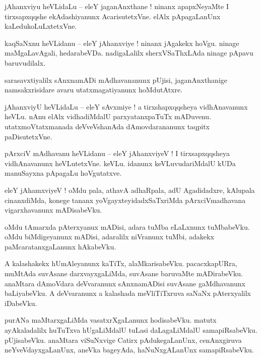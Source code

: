 \documentclass{article}
\begin{document}
\begin{mn}%
jAhanxviyu heVLidaLu -- eleY jaganAnxthane ! ninanx apapxNeyaMte I tirxsapxqqshe ekAdashiyanunx 
AcarisutetxVne. elAlx pApagaLanUnx kaLedukoLuLxtetxVne.
\end{mn}

\begin{mn}%
kaqSaNxnu heVLidanu -- eleY jAhanxviye ! ninanx jAgakekx hoVgu. ninage maMgaLavAgali, hedarabeVDa. 
nadigaLalilx sherxVSaThxLAda ninage pApavu baruvudilalx.
\end{mn}

\begin{mn}%
sarasavxtiyalilx sAnxnamADi mAdhavananunx pUjisi, jaganAnxthanige namsakxrisidare avaru 
utatxmagatiyanunx hoMdutAtxre.
\end{mn}

\begin{mn}%
jAhanxviyU heVLidaLu -- eleY sAvxmiye ! a tirxshapxqqsheya vidhAnavanunx heVLu. nAnu elAlx 
vidhadiMdalU parxyatanxpaTuTx mADuvenu. utatxmoVtatxmanada deVveVshanAda dAmovdarananunx taqpitx 
paDisutetxVne.
\end{mn}

\begin{mn}%
pArxciV mAdhavanu heVLidanu -- eleY jAhanxviyeV ! I tirxsapxqqsheya vidhAnavanunx heVLutetxVne. 
keVLu. idanunx keVLuvudariMdalU kUDa manuSayxna pApagaLu hoVgutatxve.
\end{mn}

\begin{mn}%
eleY jAhamxviyeV ! oMdu pala, athavA adhaRpala, adU Agadidadxre, kAlupala cinanxdiMda, konege 
tananx yoVgayxteyidadxSaTxriMda pArxciVmadhavana vigarxhavanunx mADisabeVku.
\end{mn}

\begin{mn}%
oMdu tAmarxda pAterxyanux mADisi, adara tuMba eLaLxnunx tuMbabeVku. oMdu biMdigeyanunx mADisi, 
adaralilx niVranunx tuMbi, adakekx paMcaratanxgaLanunx hAkabeVku.
\end{mn}

\begin{mn}%
A kalashakekx hUmAleyanunx kaTiTx, alaMkarisabeVku. pacacxkapURra, muMtAda suvAsane 
darxvayxgaLiMda, suvAsane baruvaMte mADirabeVku. anaMtara dAmoVdara deVvaranunx sAnxnamADisi 
suvAsane gaMdhavanunx baLiyabeVku. A deVvaranunx a kalashada meVliTiTxruva saNaNx pAterxyalilx 
iDabeVku.
\end{mn}

\begin{mn}%
purANa maMtarxgaLiMda vasatxrXgaLanunx hodisabeVku. matutx ayAkaladalilx huTuTxva hUgaLiMdalU 
tuLasi daLagaLiMdalU samapiRsabeVku. pUjisabeVku. anaMtara viSuNxvige Catirx pAdukegaLanUnx, 
cenAnxgiruva neYveVdayxgaLanUnx, aneVka bageyAda, haNuNxgALanUnx samapiRsabeVku.
\end{mn}
\end{document}
